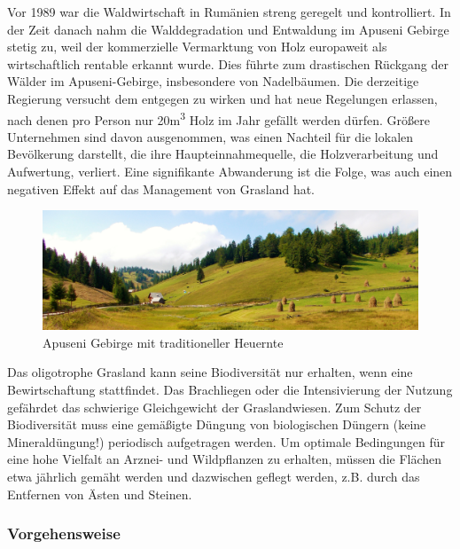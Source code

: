 Vor 1989 war die Waldwirtschaft in Rumänien streng geregelt und kontrolliert. In der Zeit danach nahm die Walddegradation und Entwaldung im Apuseni Gebirge stetig zu, weil der kommerzielle Vermarktung von Holz europaweit als wirtschaftlich rentable erkannt wurde. Dies führte zum drastischen Rückgang der Wälder im Apuseni-Gebirge, insbesondere von Nadelbäumen. Die derzeitige Regierung versucht dem entgegen zu wirken und hat neue Regelungen erlassen, nach denen pro Person nur 20m\textsuperscript{3} Holz im Jahr gefällt werden dürfen. Größere Unternehmen sind davon ausgenommen, was einen Nachteil für die lokalen Bevölkerung darstellt, die ihre Haupteinnahmequelle, die Holzverarbeitung und Aufwertung, verliert. Eine signifikante Abwanderung ist die Folge, was auch einen negativen Effekt auf das Management von Grasland hat.

\begin{figure}[htb]
 \centering
  \includegraphics[width=\textwidth,angle=0]{abb/Arnika/apusenimountain2016}
 \caption{Apuseni Gebirge mit traditioneller Heuernte \citep{Farcas2019}}
\label{fig:apuseni}
\end{figure}

Das oligotrophe Grasland kann seine Biodiversität nur erhalten, wenn eine Bewirtschaftung stattfindet. Das Brachliegen oder die Intensivierung der Nutzung gefährdet das schwierige Gleichgewicht der Graslandwiesen. Zum Schutz der Biodiversität muss eine gemäßigte Düngung von biologischen Düngern (keine Mineraldüngung!) periodisch aufgetragen werden. Um optimale Bedingungen für eine hohe Vielfalt an Arznei- und Wildpflanzen zu erhalten, müssen die Flächen etwa jährlich gemäht werden und dazwischen geflegt werden, z.B. durch das Entfernen von Ästen und Steinen.


\subsubsection{Vorgehensweise}

